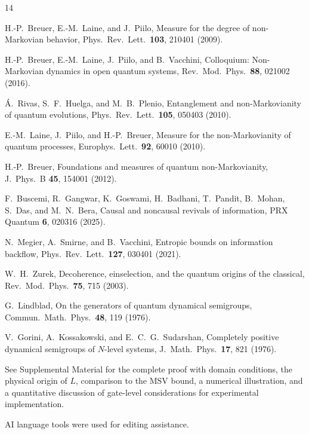 \documentclass[aps,pra,twocolumn,superscriptaddress,hyperref]{revtex4-2}
\begin{document}
\begin{thebibliography}{14}

H.-P.~Breuer, E.-M.~Laine, and J.~Piilo,
Measure for the degree of non-Markovian behavior,
Phys.\ Rev.\ Lett.\ \textbf{103}, 210401 (2009).

H.-P.~Breuer, E.-M.~Laine, J.~Piilo, and B.~Vacchini,
Colloquium: Non-Markovian dynamics in open quantum systems,
Rev.\ Mod.\ Phys.\ \textbf{88}, 021002 (2016).

\'A.~Rivas, S.~F.~Huelga, and M.~B.~Plenio,
Entanglement and non-Markovianity of quantum evolutions,
Phys.\ Rev.\ Lett.\ \textbf{105}, 050403 (2010).

E.-M.~Laine, J.~Piilo, and H.-P.~Breuer,
Measure for the non-Markovianity of quantum processes,
Europhys.\ Lett.\ \textbf{92}, 60010 (2010).

H.-P.~Breuer,
Foundations and measures of quantum non-Markovianity,
J.\ Phys.\ B \textbf{45}, 154001 (2012).

F.~Buscemi, R.~Gangwar, K.~Goswami, H.~Badhani, T.~Pandit, B.~Mohan, S.~Das, and M.~N.~Bera,
Causal and noncausal revivals of information,
PRX Quantum \textbf{6}, 020316 (2025).

N.~Megier, A.~Smirne, and B.~Vacchini,
Entropic bounds on information backflow,
Phys.\ Rev.\ Lett.\ \textbf{127}, 030401 (2021).

W.~H.~Zurek,
Decoherence, einselection, and the quantum origins of the classical,
Rev.\ Mod.\ Phys.\ \textbf{75}, 715 (2003).

G.~Lindblad,
On the generators of quantum dynamical semigroups,
Commun.\ Math.\ Phys.\ \textbf{48}, 119 (1976).

V.~Gorini, A.~Kossakowski, and E.~C.~G.~Sudarshan,
Completely positive dynamical semigroups of $N$-level systems,
J.\ Math.\ Phys.\ \textbf{17}, 821 (1976).

See Supplemental Material for the complete proof with domain conditions, the physical origin of $L$, comparison to the MSV bound, a numerical illustration, and a quantitative discussion of gate-level considerations for experimental implementation.

\end{thebibliography}

\acknowledgments
AI language tools were used for editing assistance.
\end{document}
